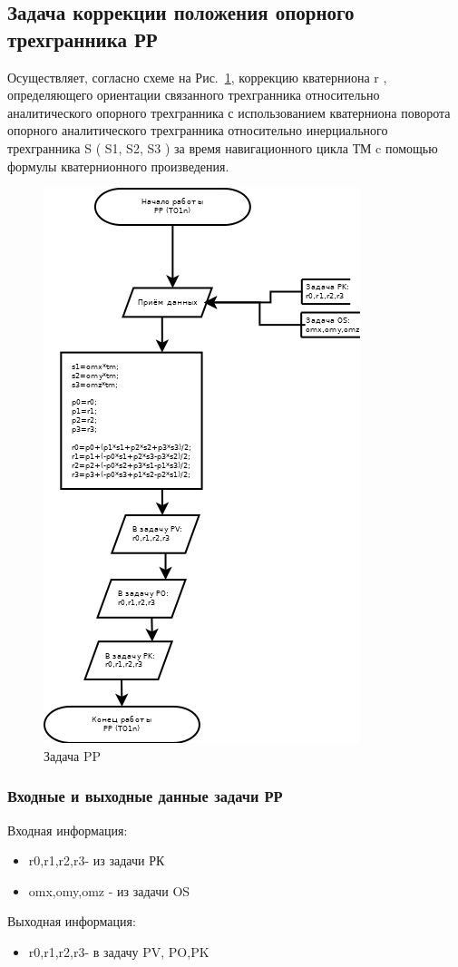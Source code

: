 \subsection{Задача коррекции положения опорного трехгранника РР}
Осуществляет, согласно схеме на Рис.~\ref{fig:PP}, коррекцию  кватерниона r ,  определяющего ориентации связанного трехгранника относительно  
аналитического опорного трехгранника с использованием  кватерниона  поворота опорного аналитического трехгранника   относительно   
инерциального трехгранника  S  (  S1,  S2,  S3 ) за время навигационного  цикла  ТМ c  помощью  формулы кватернионного произведения.
\begin{figure}[H]
    \centering
    \includegraphics[width=0.75\linewidth]{images/PP.png}
    \caption{Задача PP}
    \label{fig:PP}
\end{figure}
\subsubsection{Входные и выходные данные задачи РР}
Входная информация:
\begin{itemize}
 \item r0,r1,r2,r3- из задачи  РК
 \item omx,omy,omz - из задачи  OS
\end{itemize}
Выходная информация:
\begin{itemize}
\item r0,r1,r2,r3- в задачу PV, PO,PK
\end{itemize}